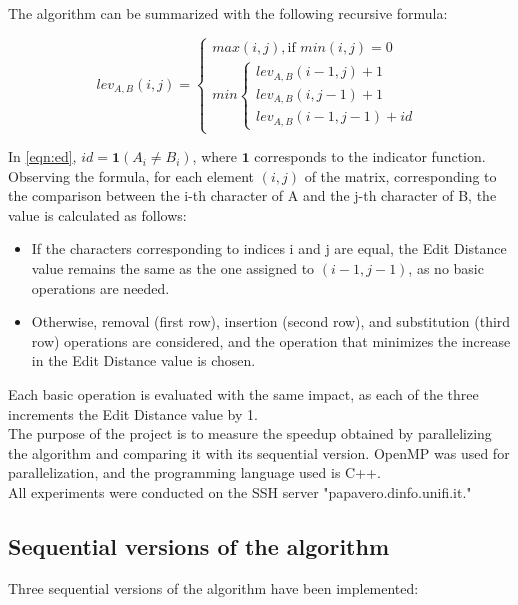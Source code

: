\documentclass[10pt,twocolumn,letterpaper]{article}
\newcommand{\bit} {\begin{itemize} }
\newcommand{\eit} {\end{itemize} }
\begin{document}
The algorithm can be summarized with the following recursive formula:

\begin{equation}
    \label{eqn:ed}
    lev_{A,B}(i,j) = \begin{cases}
        max(i,j), \text{if } min(i,j) = 0\\
        min \begin{cases}
            lev_{A,B}(i-1,j) + 1\\
            lev_{A,B}(i,j-1) + 1\\
            lev_{A,B}(i-1,j-1) + id
        \end{cases}
    \end{cases}
\end{equation}

In \cref{eqn:ed}, $id = \bm{1}(A_{i} \neq B_{i})$, where $\bm{1}$ corresponds to the indicator function.\\
Observing the formula, for each element $(i, j)$ of the matrix, corresponding to the comparison between the i-th character of A and the j-th character of B, the value is calculated as follows:

\bit
    \item{If the characters corresponding to indices i and j are equal, the Edit Distance value remains the same as the one assigned to $(i - 1, j - 1)$, as no basic operations are needed.}
    \item{Otherwise, removal (first row), insertion (second row), and substitution (third row) operations are considered, and the operation that minimizes the increase in the Edit Distance value is chosen.}
\eit

Each basic operation is evaluated with the same impact, as each of the three increments the Edit Distance value by 1.\\
The purpose of the project is to measure the speedup obtained by parallelizing the algorithm and comparing it with its sequential version. OpenMP was used for parallelization, and the programming language used is C++.\\
All experiments were conducted on the SSH server "papavero.dinfo.unifi.it."

\subsection{Sequential versions of the algorithm}

Three sequential versions of the algorithm have been implemented:
\end{document}
